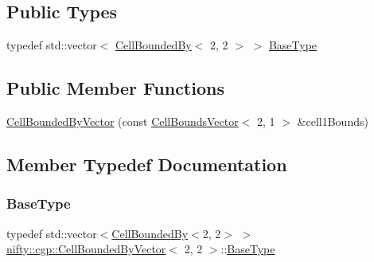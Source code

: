 \subsection*{Public Types}
\begin{DoxyCompactItemize}
\item 
typedef std\+::vector$<$ \hyperlink{classnifty_1_1cgp_1_1CellBoundedBy}{Cell\+Bounded\+By}$<$ 2, 2 $>$ $>$ \hyperlink{classnifty_1_1cgp_1_1CellBoundedByVector_3_012_00_012_01_4_acf1174515755206bce20310f87af4747}{Base\+Type}
\end{DoxyCompactItemize}
\subsection*{Public Member Functions}
\begin{DoxyCompactItemize}
\item 
\hyperlink{classnifty_1_1cgp_1_1CellBoundedByVector_3_012_00_012_01_4_af6f91256e589a2504b9362c4da176893}{Cell\+Bounded\+By\+Vector} (const \hyperlink{classnifty_1_1cgp_1_1CellBoundsVector}{Cell\+Bounds\+Vector}$<$ 2, 1 $>$ \&cell1\+Bounds)
\end{DoxyCompactItemize}


\subsection{Member Typedef Documentation}
\mbox{\label{classnifty_1_1cgp_1_1CellBoundedByVector_3_012_00_012_01_4_acf1174515755206bce20310f87af4747}} 
\subsubsection{\texorpdfstring{Base\+Type}{BaseType}}
{\footnotesize\ttfamily typedef std\+::vector$<$\hyperlink{classnifty_1_1cgp_1_1CellBoundedBy}{Cell\+Bounded\+By}$<$2, 2$>$ $>$ \hyperlink{classnifty_1_1cgp_1_1CellBoundedByVector}{nifty\+::cgp\+::\+Cell\+Bounded\+By\+Vector}$<$ 2, 2 $>$\+::\hyperlink{classnifty_1_1cgp_1_1CellBoundedByVector_3_012_00_012_01_4_acf1174515755206bce20310f87af4747}{Base\+Type}}



